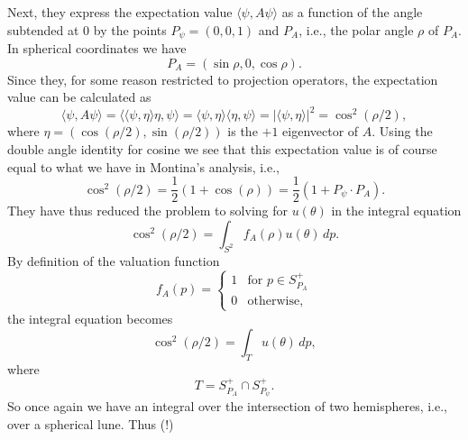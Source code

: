 \documentclass[12pt,draft]{article}
\theoremstyle{definition}
\theoremstyle{plain}
\begin{document}
    Next, they express the expectation value $\langle \psi,
    A\psi\rangle$ as a function of the angle subtended at
    $0$ by the points $P_\psi = (0,0,1)$ and $P_A$, i.e.,
    the polar angle $\rho$ of $P_A$. In spherical
    coordinates we have
    \begin{equation}
        P_A
        = (\sin \rho, 0, \cos \rho).
    \end{equation}
    Since they, for some reason restricted to projection
    operators, the expectation value can be calculated as
    \begin{equation}
        \langle \psi, A\psi \rangle
        = \langle \langle \psi, \eta \rangle\eta, \psi
        \rangle
        = \langle \psi, \eta \rangle \langle \eta, \psi
        \rangle
        = |\langle \psi,\eta \rangle|^2
        = \cos^2(\rho / 2),
    \end{equation}
    where $\eta = (\cos(\rho / 2), \sin(\rho / 2))$ is the
    $+1$ eigenvector of $A$. {\color{blue} Using the double
        angle identity for cosine we see that this
        expectation value is of course equal to what we have
        in Montina's analysis, i.e., 
        \begin{equation}
            \cos^2(\rho / 2)
            = \frac{1}{2} \left( 1 + \cos(\rho) \right)
            = \frac{1}{2} \left( 1 + P_\psi \cdot P_A
            \right). 
        \end{equation}
    }
    They have thus reduced the problem to solving for
    $u(\theta)$ in the integral equation
    \begin{equation}
        \cos^2(\rho / 2)
        = \int_{S^2} f_A(\rho) u(\theta) \, dp.
    \end{equation}
    By definition of the valuation function
    \begin{equation}
        f_A(p)
        = \begin{cases}
            1 & \text{for } p \in S^+_{P_A} \\
            0 & \text{otherwise},
        \end{cases}
    \end{equation}
    the integral equation becomes
    \begin{equation}
        \cos^2(\rho / 2)
        = \int_{T} u(\theta) \, dp,
    \end{equation}
    where
    \begin{equation}
        T
        = S^+_{P_A} \cap S^+_{P_\psi}.
    \end{equation}
    {\color{blue} So once again we have an integral over the
        intersection of two hemispheres, i.e., over a
    spherical lune.} Thus (!)
\end{document}
